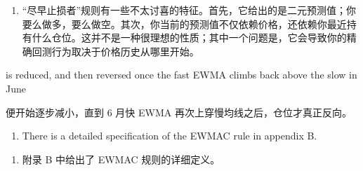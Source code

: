 \begin{enumerate}
\item “尽早止损者”规则有一些不太讨喜的特征。首先，它给出的是二元预测值；你要么做多，要么做空。其次，你当前的预测值不仅依赖价格，还依赖你最近持有什么仓位。这并不是一种很理想的性质；其中一个问题是，它会导致你的精确回测行为取决于价格历史从哪里开始。\end{enumerate}

\begin{englishblock} is reduced, and then reversed once the fast EWMA climbs back above the slow in June \end{englishblock}

\begin{chineseblock}便开始逐步减小，直到 6 月快 EWMA 再次上穿慢均线之后，仓位才真正反向。\end{chineseblock}

\begin{enumerate}
\item There is a detailed specification of the EWMAC rule in appendix B. \end{enumerate}

\begin{enumerate}
\item 附录 B 中给出了 EWMAC 规则的详细定义。\end{enumerate}



